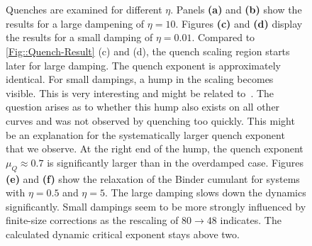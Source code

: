 	\begin{figure}
		\begin{subfigure}{0.475\textwidth}
			\centering		
		\end{subfigure}
		\begin{subfigure}{0.475\textwidth}
			\centering		
		\end{subfigure} \\ \par\bigskip
		\begin{subfigure}{0.475\textwidth}
			\centering
			
		\end{subfigure}
		\begin{subfigure}{0.475\textwidth}
			\centering		
			
		\end{subfigure} \\ \par\bigskip
		\begin{subfigure}{0.475\textwidth}
			\centering
			
		\end{subfigure}
		\begin{subfigure}{0.475\textwidth}
			\centering		
			
		\end{subfigure}
		\caption{Quenches are examined for different $\eta$. Panels \textbf{(a)} and \textbf{(b)} show the results for a large dampening of $\eta =	10$. Figures \textbf{(c)} and \textbf{(d)} display the results for a small damping of $\eta = 0.01$. Compared to \def\figureautorefname{Figs.}\autoref{Fig::Quench-Result}\def\figureautorefname{Fig.} (c) and (d), the quench scaling region starts later for large damping. The quench exponent is approximately identical. For small dampings, a hump in the scaling becomes visible. This is very interesting and might be related to~\cite{ladewig2020kibble}. The question arises as to whether this hump also exists on all other curves and was not observed by quenching too quickly. This might be an explanation for the systematically larger quench exponent that we observe. At the right end of the hump, the quench exponent $\mu_Q \approx 0.7$ is significantly larger than in the overdamped case. Figures \textbf{(e)} and \textbf{(f)} show the relaxation of the Binder cumulant for systems with $\eta = 0.5$ and $\eta = 5$. The large damping slows down the dynamics significantly. Small dampings seem to be more strongly influenced by finite-size corrections as the rescaling of $80 \rightarrow 48$ indicates. The calculated dynamic critical exponent stays above two.}
		\label{Fig::Quench-Result-eta}
	\end{figure}		
